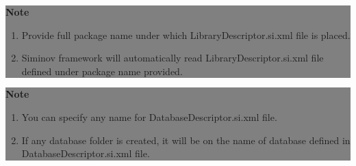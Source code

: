 \begin{enumerate}
			\begin{center}
				\colorbox{grey}{
					\parbox[t]{.8\linewidth}{
						\fontsize{11pt}{11pt}\selectfont %
						\vspace*{0.1cm} %
		
						\hfill \textbf{Note} \\

						\hfill 

						\begin{enumerate}

							\item \small Provide full package name under which LibraryDescriptor.si.xml file is placed.

							\item \small Siminov framework will automatically read LibraryDescriptor.si.xml file defined under package name provided.
	
						\end{enumerate}

						\vspace*{0.0cm} %
					}
			}

			\end{center}

\end{enumerate}


	\begin{center}
		\colorbox{grey}{
			\parbox[t]{.8\linewidth}{
				\fontsize{11pt}{11pt}\selectfont %
				\vspace*{0.1cm} %
		
				\hfill \textbf{Note} \\

				\hfill 

				\begin{enumerate}

					\item \small You can specify any name for DatabaseDescriptor.si.xml file.

					\item \small If any database folder is created, it will be on the name of database defined in DatabaseDescriptor.si.xml file.
	
				\end{enumerate}

				\vspace*{0.0cm} %
			}
	}

\end{center}

